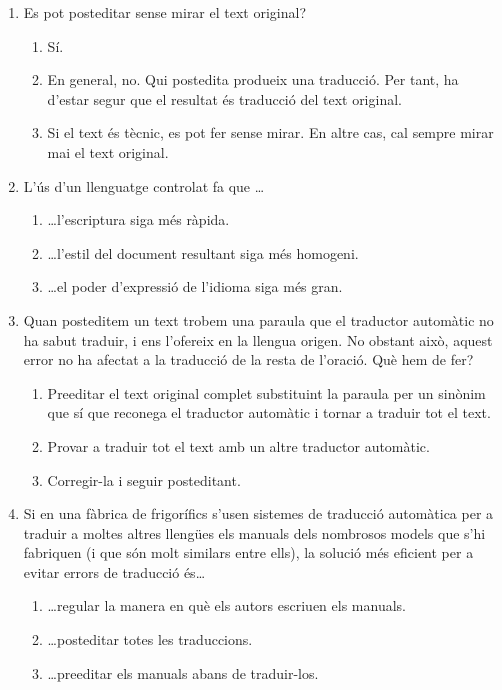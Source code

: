 \begin{enumerate}
\item Es pot posteditar sense mirar el text original?
  \begin{enumerate}
  \item Sí.
  \item En general, no. Qui postedita produeix una traducció. Per
    tant, ha d'estar segur que el resultat és traducció del text
    original.
  \item Si el text és tècnic, es pot fer sense mirar. En altre cas, cal
    sempre mirar mai el text original.
  \end{enumerate}

\item L'ús d'un llenguatge controlat fa que \ldots
  \begin{enumerate}
  \item \ldots l'escriptura siga més ràpida.
  \item \ldots l'estil del document resultant siga més homogeni.
  \item \ldots el poder d'expressió de l'idioma siga més gran.
  \end{enumerate}

\item Quan posteditem un text trobem una paraula que el traductor
  automàtic no ha sabut traduir, i ens l'ofereix en la llengua
  origen. No obstant això, aquest error no ha afectat a la traducció
  de la resta de l'oració. Què hem de fer?
  \begin{enumerate}
  \item Preeditar el text original complet substituint la paraula per
    un sinònim que sí que reconega el traductor automàtic i tornar a
    traduir tot el text.
  \item Provar a traduir tot el text amb un altre traductor automàtic.
  \item Corregir-la i seguir posteditant.
  \end{enumerate}

\item Si en una fàbrica de frigorífics s'usen sistemes de traducció
  automàtica per a traduir a moltes altres llengües els manuals dels
  nombrosos models que s'hi fabriquen (i que són molt similars entre
  ells), la solució més eficient per a evitar errors de traducció
  és{\ldots}
  \begin{enumerate}
  \item \ldots regular la manera en què els autors escriuen els
    manuals.
  \item \ldots posteditar totes les traduccions.
  \item \ldots preeditar els manuals abans de traduir-los.
  \end{enumerate}


\end{enumerate}
